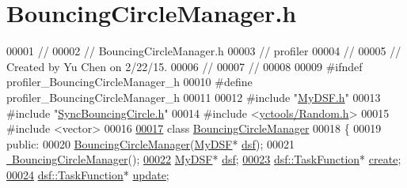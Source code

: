 \hypertarget{_bouncing_circle_manager_8h_source}{}\section{Bouncing\+Circle\+Manager.\+h}
\label{_bouncing_circle_manager_8h_source}

\begin{DoxyCode}
00001 \textcolor{comment}{//}
00002 \textcolor{comment}{//  BouncingCircleManager.h}
00003 \textcolor{comment}{//  profiler}
00004 \textcolor{comment}{//}
00005 \textcolor{comment}{//  Created by Yu Chen on 2/22/15.}
00006 \textcolor{comment}{//}
00007 \textcolor{comment}{//}
00008 
00009 \textcolor{preprocessor}{#ifndef profiler\_BouncingCircleManager\_h}
00010 \textcolor{preprocessor}{#define profiler\_BouncingCircleManager\_h}
00011 
00012 \textcolor{preprocessor}{#include "\hyperlink{_my_d_s_f_8h}{MyDSF.h}"}
00013 \textcolor{preprocessor}{#include "\hyperlink{_sync_bouncing_circle_8h}{SyncBouncingCircle.h}"}
00014 \textcolor{preprocessor}{#include <\hyperlink{_random_8h}{yctools/Random.h}>}
00015 \textcolor{preprocessor}{#include <vector>}
00016 
\hypertarget{_bouncing_circle_manager_8h_source_l00017}{}\hyperlink{class_bouncing_circle_manager}{00017} \textcolor{keyword}{class }\hyperlink{class_bouncing_circle_manager}{BouncingCircleManager}
00018 \{
00019 \textcolor{keyword}{public}:
00020     \hyperlink{class_bouncing_circle_manager_a03956961ae6a7c55ffccb15928c58802}{BouncingCircleManager}(\hyperlink{class_my_d_s_f}{MyDSF}* \hyperlink{namespacedsf}{dsf});
00021     \hyperlink{class_bouncing_circle_manager_afa060fb52ab29a72169af32eb03e39a1}{~BouncingCircleManager}();
\hypertarget{_bouncing_circle_manager_8h_source_l00022}{}\hyperlink{class_bouncing_circle_manager_a4c48cd67fe5ff21396b9e5552d2159a1}{00022}     \hyperlink{class_my_d_s_f}{MyDSF}* \hyperlink{class_bouncing_circle_manager_a4c48cd67fe5ff21396b9e5552d2159a1}{dsf};
\hypertarget{_bouncing_circle_manager_8h_source_l00023}{}\hyperlink{class_bouncing_circle_manager_a470d50514892c85df73f25358d202d1b}{00023}     \hyperlink{namespacedsf_aa16e735f29587f4485b56fc46746f7a9}{dsf::TaskFunction}* \hyperlink{class_bouncing_circle_manager_a470d50514892c85df73f25358d202d1b}{create};
\hypertarget{_bouncing_circle_manager_8h_source_l00024}{}\hyperlink{class_bouncing_circle_manager_a40c60a1170ab1528bf67c86bcc2d7637}{00024}     \hyperlink{namespacedsf_aa16e735f29587f4485b56fc46746f7a9}{dsf::TaskFunction}* \hyperlink{class_bouncing_circle_manager_a40c60a1170ab1528bf67c86bcc2d7637}{update};

\end{DoxyCode}
